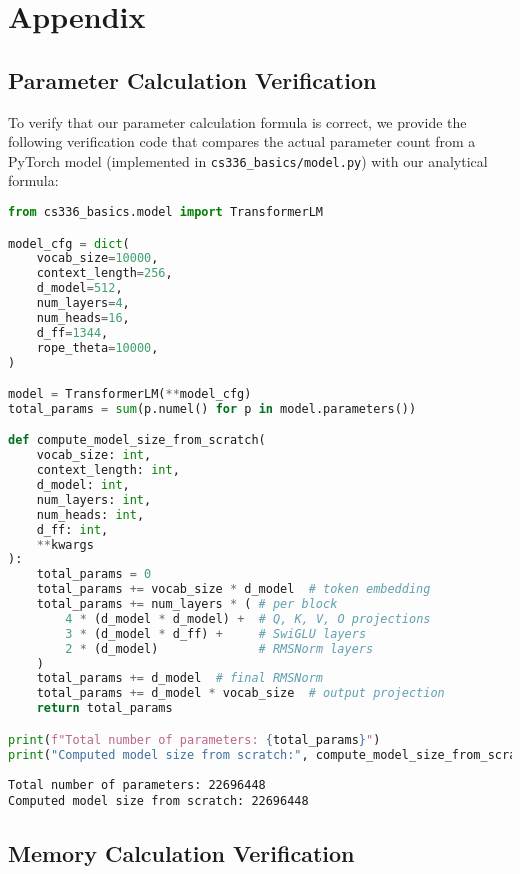 \section{Appendix}

\subsection{Parameter Calculation Verification}
\label{appendix:param-verification}

To verify that our parameter calculation formula is correct, we provide the following verification code that compares the actual parameter count from a PyTorch model (implemented in \texttt{cs336\_basics/model.py}) with our analytical formula:

\begin{lstlisting}[language=Python, caption={Parameter count verification code}]
from cs336_basics.model import TransformerLM

model_cfg = dict(
    vocab_size=10000,
    context_length=256,
    d_model=512,
    num_layers=4,
    num_heads=16,
    d_ff=1344, 
    rope_theta=10000,
)

model = TransformerLM(**model_cfg)
total_params = sum(p.numel() for p in model.parameters())

def compute_model_size_from_scratch(
    vocab_size: int,
    context_length: int,
    d_model: int,
    num_layers: int,
    num_heads: int,
    d_ff: int,
    **kwargs
):
    total_params = 0
    total_params += vocab_size * d_model  # token embedding
    total_params += num_layers * ( # per block
        4 * (d_model * d_model) +  # Q, K, V, O projections
        3 * (d_model * d_ff) +     # SwiGLU layers
        2 * (d_model)              # RMSNorm layers
    )
    total_params += d_model  # final RMSNorm
    total_params += d_model * vocab_size  # output projection
    return total_params

print(f"Total number of parameters: {total_params}")     
print("Computed model size from scratch:", compute_model_size_from_scratch(**model_cfg))
\end{lstlisting}

\begin{lstlisting}
Total number of parameters: 22696448
Computed model size from scratch: 22696448
\end{lstlisting}

\subsection{Memory Calculation Verification}
\label{appendix:memory-verification}

